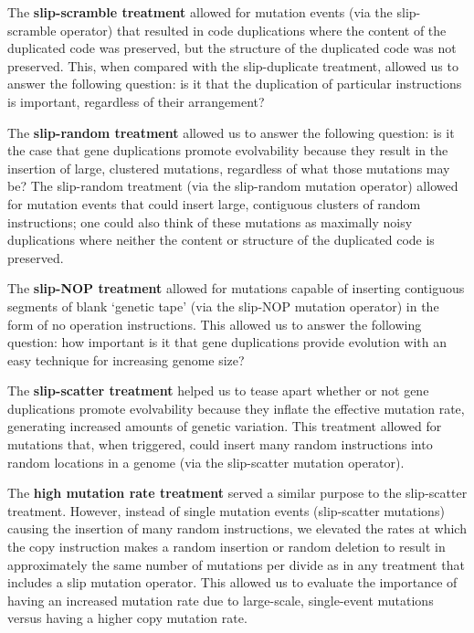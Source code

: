 The \textbf{slip-scramble treatment} allowed for mutation events (via the slip-scramble operator) that resulted in code duplications where the content of the duplicated code was preserved, but the structure of the duplicated code was not preserved. This, when compared with the slip-duplicate treatment, allowed us to answer the following question: is it that the duplication of particular instructions is important, regardless of their arrangement?

The \textbf{slip-random treatment} allowed us to answer the following question: is it the case that gene duplications promote evolvability because they result in the insertion of large, clustered mutations, regardless of what those mutations may be? The slip-random treatment (via the slip-random mutation operator) allowed for mutation events that could insert large, contiguous clusters of random instructions; one could also think of these mutations as maximally noisy duplications where neither the content or structure of the duplicated code is preserved.

The \textbf{slip-NOP treatment} allowed for mutations capable of inserting contiguous segments of blank `genetic tape' (via the slip-NOP mutation operator) in the form of no operation instructions. This allowed us to answer the following question: how important is it that gene duplications provide evolution with an easy technique for increasing genome size?

The \textbf{slip-scatter treatment} helped us to tease apart whether or not gene duplications promote evolvability because they inflate the effective mutation rate, generating increased amounts of genetic variation. This treatment allowed for mutations that, when triggered, could insert many random instructions into random locations in a genome (via the slip-scatter mutation operator).

The \textbf{high mutation rate treatment} served a similar purpose to the slip-scatter treatment. However, instead of single mutation events (slip-scatter mutations) causing the insertion of many random instructions, we elevated the rates at which the copy instruction makes a random insertion or random deletion to result in approximately the same number of mutations per divide as in any treatment that includes a slip mutation operator. This allowed us to evaluate the importance of having an increased mutation rate due to large-scale, single-event mutations versus having a higher copy mutation rate.

